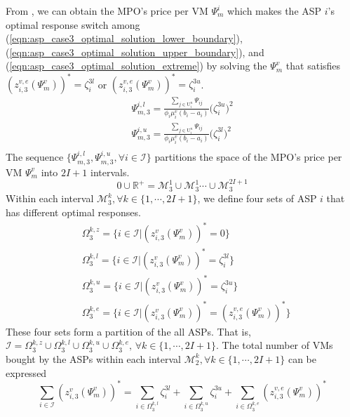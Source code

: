 \documentclass[conference]{IEEEtran}
\begin{document}
From , we can obtain the MPO's price per VM $\Psi_m^i$ which makes the ASP $i$'s optimal response switch among (\ref{eqn:asp_case3_optimal_solution_lower_boundary}), (\ref{eqn:asp_case3_optimal_solution_upper_boundary}), and (\ref{eqn:asp_case3_optimal_solution_extreme}) by solving the $\Psi_m^v$ that satisfies $(z_{i,3}^{v,e}(\Psi_m^v))^* = \zeta_i^{3l}$ or $(z_{i,3}^{v,e}(\Psi_m^v))^* = \zeta_i^{3u}$.
\begin{equation}
\begin{aligned}
\Psi_{m,3}^{i,l} = \frac{\sum_{j \in \mathrm{U}_i^n}\Psi_{ij}}{\phi_i \mu_i^v(b_i-a_i)}\big(\zeta_i^{3u}\big)^2 \\
\Psi_{m,3}^{i,u} = \frac{\sum_{j \in \mathrm{U}_i^n}\Psi_{ij}}{\phi_i \mu_i^v(b_i-a_i)}\big(\zeta_i^{3l}\big)^2 \\
\end{aligned}
\end{equation}
The sequence $\{\Psi_{m,3}^{i,l} , \Psi_{m,3}^{i,u}, \forall i \in \mathcal{I}\}$ partitions the space of the MPO's price per VM $\Psi_m^v$ into $2I + 1$ intervals.
\begin{equation}
0 \cup \mathbb{R}^{+} = \mathcal{M}_3^1 \cup \mathcal{M}_3^1 \cdots \cup \mathcal{M}_3^{2I+1}
\end{equation}
Within each interval $\mathcal{M}_3^k, \forall k \in \{1, \cdots, 2I+1\}$, we define four sets of ASP $i$ that has different optimal responses.
\begin{equation}
\begin{aligned}
&\Omega_3^{k,z} = \{i \in \mathcal{I}|(z_{i,3}^v(\Psi_m^v))^* = 0\} \\
&\Omega_3^{k,l} = \{i \in \mathcal{I}|(z_{i,3}^v(\Psi_m^v))^* = \zeta_i^{3l}\} \\
&\Omega_3^{k,u} = \{i \in \mathcal{I}|(z_{i,3}^v(\Psi_m^v))^* = \zeta_i^{3u}\} \\
&\Omega_3^{k,e} = \{i \in \mathcal{I}|(z_{i,3}^v(\Psi_m^v))^* = (z_{i,3}^{v,e}(\Psi_m^v))^*\}
\end{aligned}
\end{equation}
These four sets form a partition of the all ASPs. That is, $\mathcal{I} = \Omega_3^{k,z} \cup \Omega_3^{k,l} \cup \Omega_3^{k,u} \cup \Omega_3^{k,e}, \, \forall k \in \{1, \cdots, 2I+1\}$. The total number of VMs bought by the ASPs within each interval $\mathcal{M}_2^k, \forall k \in \{1, \cdots, 2I+1\}$ can be expressed
\begin{equation}\label{eqn:asp_case3_total_number_VM}
\sum_{i \in \mathcal{I}} (z_{i,3}^v(\Psi_m^v))^* =  \sum_{i\in \Omega_3^{k,l}}\zeta_i^{3l} + \sum_{i\in \Omega_3^{k,u}}\zeta_i^{3u} + \sum_{i \in \Omega_3^{k,e}}(z_{i,3}^{v,e}(\Psi_m^v))^*
\end{equation}
\end{document}
